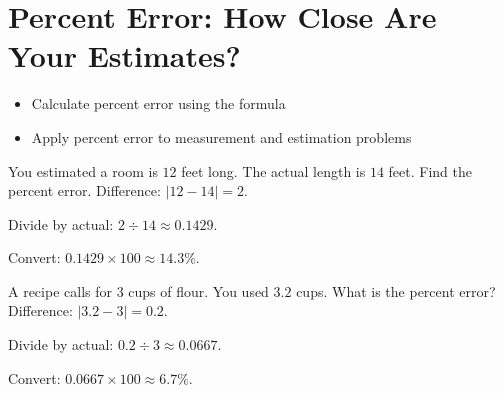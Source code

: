 \section{Percent Error: How Close Are Your Estimates?}

\begin{stepGoal}
\begin{itemize}
    \item Calculate percent error using the formula
    \item Apply percent error to measurement and estimation problems
\end{itemize}
\end{stepGoal}

\begin{stepVocabBox}
\end{stepVocabBox}

\begin{stepsCard}
\end{stepsCard}

\begin{stepExample}{You estimated a room is $12$ feet long. The actual length is $14$ feet. Find the percent error.}
     Difference: $|12 - 14| = 2$.

     Divide by actual: $2 \div 14 \approx 0.1429$.

     Convert: $0.1429 \times 100 \approx 14.3\%$.
\end{stepExample}

\begin{stepExample}{A recipe calls for $3$ cups of flour. You used $3.2$ cups. What is the percent error?}
     Difference: $|3.2 - 3| = 0.2$.

     Divide by actual: $0.2 \div 3 \approx 0.0667$.

     Convert: $0.0667 \times 100 \approx 6.7\%$.
\end{stepExample}

